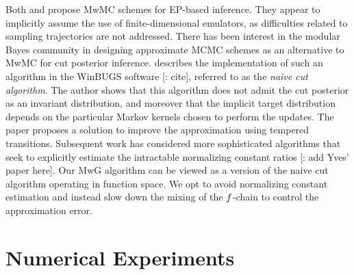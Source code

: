 \documentclass[12pt]{article}
\begin{document}
Both \citep{garegnani2021NoisyMCMC} and \citet{BurknerSurrogate} propose MwMC schemes
for EP-based inference. They appear to implicitly assume the use of finite-dimensional emulators,
as difficulties related to sampling trajectories are not addressed. There has been interest in the 
modular Bayes community in designing approximate MCMC schemes as an alternative to
MwMC for cut posterior inference. \citet{PlummerCut} describes the implementation of such 
an algorithm in the WinBUGS software [\todo: cite], referred to as the \textit{naive cut algorithm}.
The author shows that this algorithm does not admit the cut posterior as an invariant
distribution, and moreover that the implicit target distribution depends on the particular Markov kernels
chosen to perform the updates. The paper proposes a solution to improve the approximation 
using tempered transitions. Subsequent work has considered more sophisticated algorithms
that seek to explicitly estimate the intractable normalizing constant ratios
\citep{SAACut} [\todo: add Yves' paper here]. 
Our MwG algorithm can be viewed as a version of the naive cut algorithm operating in function space.
We opt to avoid normalizing constant estimation and instead slow down the mixing of the 
$f$-chain to control the approximation error.

\section{Numerical Experiments} \label{sec:experiments}

\end{document}
